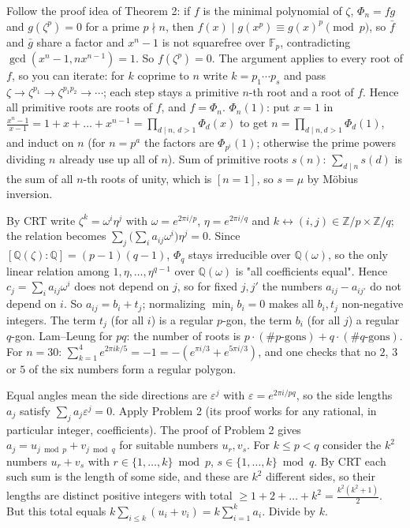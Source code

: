 \documentclass[11pt,a4paper]{article}
\begin{document}

 Follow the proof idea of Theorem 2: if $f$ is the minimal polynomial of $\zeta$, $\Phi_n=fg$ and $g(\zeta^p)=0$ for a prime $p\nmid n$, then $f(x)\mid g(x^p)\equiv g(x)^p\pmod p$, so $\bar f$ and $\bar g$ share a factor and $x^n-1$ is not squarefree over $\mathbb{F}_p$, contradicting $\gcd(x^n-1,nx^{n-1})=1$. So $f(\zeta^p)=0$.
 The argument applies to every root of $f$, so you can iterate: for $k$ coprime to $n$ write $k=p_1\cdots p_s$ and pass $\zeta\to\zeta^{p_1}\to\zeta^{p_1p_2}\to\cdots$; each step stays a primitive $n$-th root and a root of $f$. Hence all primitive roots are roots of $f$, and $f=\Phi_n$.
 $\Phi_n(1)$: put $x=1$ in $\frac{x^n-1}{x-1}=1+x+\dots+x^{n-1}=\prod_{d\mid n,\,d>1}\Phi_d(x)$ to get $n=\prod_{d\mid n,d>1}\Phi_d(1)$, and induct on $n$ (for $n=p^a$ the factors are $\Phi_{p^i}(1)$; otherwise the prime powers dividing $n$ already use up all of $n$). Sum of primitive roots $s(n)$: $\sum_{d\mid n}s(d)$ is the sum of all $n$-th roots of unity, which is $[n=1]$, so $s=\mu$ by M\"obius inversion.

 By CRT write $\zeta^k=\omega^i\eta^j$ with $\omega=e^{2\pi i/p}$, $\eta=e^{2\pi i/q}$ and $k\leftrightarrow(i,j)\in\mathbb{Z}/p\times\mathbb{Z}/q$; the relation becomes $\sum_j\bigl(\sum_ia_{ij}\omega^i\bigr)\eta^j=0$.
 Since $[\mathbb{Q}(\zeta):\mathbb{Q}]=(p-1)(q-1)$, $\Phi_q$ stays irreducible over $\mathbb{Q}(\omega)$, so the only linear relation among $1,\eta,\dots,\eta^{q-1}$ over $\mathbb{Q}(\omega)$ is "all coefficients equal". Hence $c_j=\sum_ia_{ij}\omega^i$ does not depend on $j$, so for fixed $j,j'$ the numbers $a_{ij}-a_{ij'}$ do not depend on $i$.
 So $a_{ij}=b_i+t_j$; normalizing $\min_i b_i=0$ makes all $b_i,t_j$ non-negative integers. The term $t_j$ (for all $i$) is a regular $p$-gon, the term $b_i$ (for all $j$) a regular $q$-gon. Lam--Leung for $pq$: the number of roots is $p\cdot(\#p\text{-gons})+q\cdot(\#q\text{-gons})$. For $n=30$: $\sum_{k=1}^4e^{2\pi ik/5}=-1=-(e^{\pi i/3}+e^{5\pi i/3})$, and one checks that no $2$, $3$ or $5$ of the six numbers form a regular polygon.

 Equal angles mean the side directions are $\varepsilon^j$ with $\varepsilon=e^{2\pi i/pq}$, so the side lengths $a_j$ satisfy $\sum_ja_j\varepsilon^j=0$. Apply Problem 2 (its proof works for any rational, in particular integer, coefficients).
 The proof of Problem 2 gives $a_j=u_{j\bmod p}+v_{j\bmod q}$ for suitable numbers $u_r,v_s$. For $k\le p<q$ consider the $k^2$ numbers $u_{r}+v_{s}$ with $r\in\{1,\dots,k\}\bmod p$, $s\in\{1,\dots,k\}\bmod q$.
 By CRT each such sum is the length of some side, and these are $k^2$ different sides, so their lengths are distinct positive integers with total $\ge1+2+\dots+k^2=\frac{k^2(k^2+1)}2$. But this total equals $k\sum_{i\le k}(u_i+v_i)=k\sum_{i=1}^ka_i$. Divide by $k$.
\end{document}
